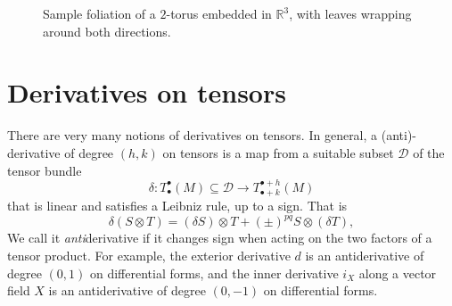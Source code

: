 \begin{figure}[h]
    \centering
    \caption{Sample foliation of a $2$-torus embedded in $\mathbb{R}^3$, with leaves wrapping around both directions.}
    \label{fig:torus-foliation}
\end{figure}


\section{Derivatives on tensors}

There are very many notions of derivatives on tensors.
In general, a (anti)-derivative of degree $(h,k)$ on tensors is a map from a suitable subset $\mathcal{D}$ of the tensor bundle 
\begin{equation}
    \delta: T^{\bullet}_{\bullet} (M)\subseteq \mathcal{D} \to T^{\bullet + h}_{\bullet + k} (M)
\end{equation}
that is linear and satisfies a Leibniz rule, up to a sign.
That is 
\begin{equation}
    \delta (S \otimes T) = (\delta S) \otimes T + (\pm)^{pq} S \otimes (\delta T),
\end{equation}
We call it \emph{anti}derivative if it changes sign when acting on the two factors of a tensor product.
For example, the exterior derivative $d$ is an antiderivative of degree $(0,1)$ on  differential forms, and the inner derivative $i_X$ along a vector field $X$ is an antiderivative of degree $(0,-1)$ on differential forms. 


